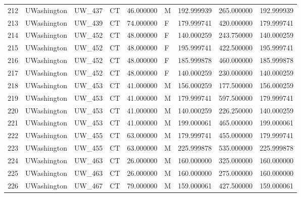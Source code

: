 \begin{tabular}{llllrlrrr}
212    &     UWashington &       UW\_437 &                 CT &  46.000000 &        M &       192.999939 &    265.000000 &  192.999939 \\
213    &     UWashington &       UW\_439 &                 CT &  74.000000 &        F &       179.999741 &    420.000000 &  179.999741 \\
214    &     UWashington &       UW\_452 &                 CT &  48.000000 &        F &       140.000259 &    243.750000 &  140.000259 \\
215    &     UWashington &       UW\_452 &                 CT &  48.000000 &        F &       195.999741 &    422.500000 &  195.999741 \\
216    &     UWashington &       UW\_452 &                 CT &  48.000000 &        F &       185.999878 &    460.000000 &  185.999878 \\
217    &     UWashington &       UW\_452 &                 CT &  48.000000 &        F &       140.000259 &    230.000000 &  140.000259 \\
218    &     UWashington &       UW\_453 &                 CT &  41.000000 &        M &       156.000259 &    177.500000 &  156.000259 \\
219    &     UWashington &       UW\_453 &                 CT &  41.000000 &        M &       179.999741 &    597.500000 &  179.999741 \\
220    &     UWashington &       UW\_453 &                 CT &  41.000000 &        M &       140.000259 &    226.250000 &  140.000259 \\
221    &     UWashington &       UW\_453 &                 CT &  41.000000 &        M &       199.000061 &    465.000000 &  199.000061 \\
222    &     UWashington &       UW\_455 &                 CT &  63.000000 &        M &       179.999741 &    455.000000 &  179.999741 \\
223    &     UWashington &       UW\_455 &                 CT &  63.000000 &        M &       225.999878 &    535.000000 &  225.999878 \\
224    &     UWashington &       UW\_463 &                 CT &  26.000000 &        M &       160.000000 &    325.000000 &  160.000000 \\
225    &     UWashington &       UW\_463 &                 CT &  26.000000 &        M &       160.000000 &    275.000000 &  160.000000 \\
226    &     UWashington &       UW\_467 &                 CT &  79.000000 &        M &       159.000061 &    427.500000 &  159.000061 \\

\end{tabular}
